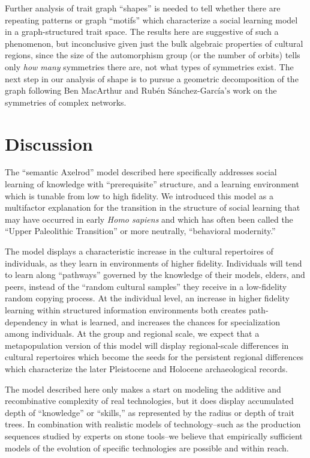 \documentclass[graybox,natbib]{svmult}
\begin{document}
Further analysis of trait graph ``shapes'' is needed to tell whether
there are repeating patterns or graph ``motifs'' which characterize a
social learning model in a graph-structured trait space. The results
here are suggestive of such a phenomenon, but inconclusive given just
the bulk algebraic properties of cultural regions, since the size of the
automorphism group (or the number of orbits) tells only \emph{how many}
symmetries there are, not what types of symmetries exist. The next step
in our analysis of shape is to pursue a geometric decomposition of the
graph following Ben MacArthur and
$\textrm{Rub\'en S\'anchez-Garc\'ia's}$
\citeyearpar{macarthur2008symmetry} work on the symmetries of complex
networks.

\section{Discussion}\label{discussion}

The ``semantic Axelrod'' model described here specifically addresses
social learning of knowledge with ``prerequisite'' structure, and a
learning environment which is tunable from low to high fidelity. We
introduced this model as a multifactor explanation for the transition in
the structure of social learning that may have occurred in early
\emph{Homo sapiens} and which has often been called the ``Upper
Paleolithic Transition'' or more neutrally, ``behavioral modernity.''

The model displays a characteristic increase in the cultural repertoires
of individuals, as they learn in environments of higher fidelity.
Individuals will tend to learn along ``pathways'' governed by the
knowledge of their models, elders, and peers, instead of the ``random
cultural samples'' they receive in a low-fidelity random copying
process. At the individual level, an increase in higher fidelity
learning within structured information environments both creates
path-dependency in what is learned, and increases the chances for
specialization among individuals. At the group and regional scale, we
expect that a metapopulation version of this model will display
regional-scale differences in cultural repertoires which become the
seeds for the persistent regional differences which characterize the
later Pleistocene and Holocene archaeological records.

The model described here only makes a start on modeling the additive and
recombinative complexity of real technologies, but it does display
accumulated depth of ``knowledge'' or ``skills,'' as represented by the
radius or depth of trait trees. In combination with realistic models of
technology--such as the production sequences studied by experts on stone
tools--we believe that empirically sufficient models of the evolution of
specific technologies are possible and within reach.
\end{document}
